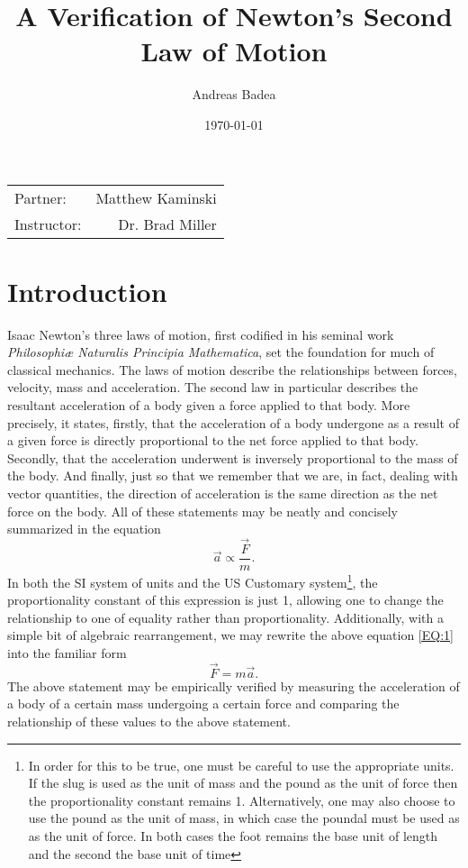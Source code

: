 \documentclass[11pt]{article}
\title{A Verification of Newton's Second Law of Motion}
\author{Andreas Badea}
\date{\today}
\begin{document}
\maketitle

\begin{center}
	\begin{tabular}{l r}
		Partner: & Matthew Kaminski \\ %
		Instructor: & Dr. Brad Miller %
	\end{tabular}
\end{center}

\section{Introduction}
Isaac Newton's three laws of motion, first codified in his seminal  work \textit{Philosophi\ae{} Naturalis Principia Mathematica}, set the foundation for much of classical mechanics. The laws of motion describe the relationships between forces, velocity, mass and acceleration. The second law in particular describes the resultant acceleration of a body given a force applied to that body. More precisely, it states, firstly, that the acceleration of a body undergone as a result of a given force is directly proportional to the net force applied to that body. Secondly, that the acceleration underwent is inversely proportional to the mass of the body. And finally, just so that we remember that we are, in fact, dealing with vector quantities, the direction of acceleration is the same direction as the net force on the body. All of these statements may be neatly and concisely summarized in the equation
 \begin{equation}
\vec{a} \propto \frac{\vec{F}}{m}. \label{EQ:1}
\end{equation}
In both the SI system of units and the US Customary system\footnote{In order for this to be true, one must be careful to use the appropriate units. If the slug is used as the unit of mass and the pound as the unit of force then the proportionality constant remains 1. Alternatively, one may also choose to use the pound as the unit of mass, in which case the poundal must be used as as the unit of force. In both cases the foot remains the base unit of length and the second the base unit of time}, the proportionality constant of this expression is just 1, allowing one to change the relationship to one of equality rather than proportionality. Additionally, with a simple bit of algebraic rearrangement, we may rewrite the above equation \eqref{EQ:1} into the familiar form
\begin{equation}
\vec{F} = m \vec{a}.
\end{equation}
The above statement may be empirically verified by measuring the acceleration of a body of a certain mass undergoing a certain force and comparing the relationship of these values to the above statement. 
\end{document}
